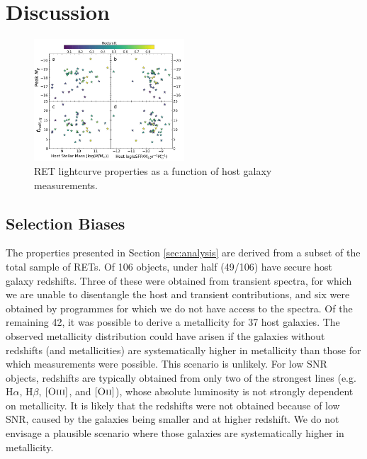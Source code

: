 \documentclass[fleqn,usenatbib,]{mnras}
\newcommand{\halpha}[0]{H$\alpha$}
\newcommand{\hbeta}[0]{H$\beta$}
\newcommand{\OII}[0]{$[\textnormal{\textsc{Oii}}]$}
\newcommand{\OIII}[0]{$[\textnormal{\textsc{Oiii}}]$}
\begin{document}
\section{Discussion \label{sec:disc}}
\begin{figure}
\includegraphics[width=0.5\textwidth]{figs/RET_vs_host.png}
\caption{RET lightcurve properties as a function of host galaxy measurements.
\label{fig:ret_v_host}}
\end{figure}
\subsection{Selection Biases \label{subsec:disc_bias}}
The properties presented in Section \ref{sec:analysis} are derived from a subset of the total sample of RETs. Of 106 objects, under half (49/106) have secure host galaxy redshifts. Three of these were obtained from transient spectra, for which we are unable to disentangle the host and transient contributions, and six were obtained by programmes for which we do not have access to the spectra. Of the remaining 42, it was possible to derive a metallicity for 37 host galaxies. The observed metallicity distribution could have arisen if the galaxies without redshifts (and metallicities) are systematically higher in metallicity than those for which measurements were possible. This scenario is unlikely. For low SNR objects, redshifts are typically obtained from only two of the strongest lines (e.g. \halpha, \hbeta, \OIII, and \OII), whose absolute luminosity is not strongly dependent on metallicity. It is likely that the redshifts were not obtained because of low SNR, caused by the galaxies being smaller and at higher redshift. We do not envisage a plausible scenario where those galaxies are systematically higher in metallicity.
\end{document}
